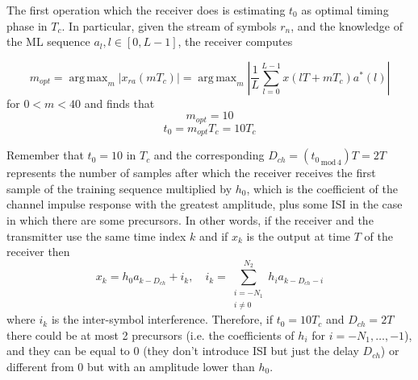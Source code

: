 \documentclass[10pt]{article}
\DeclareMathOperator*{\argmax}{arg\,max}
\newcommand{\lmod}[1] {_{\,\mathrm{mod}\,#1}}
\begin{document}
The first operation which the receiver does is estimating $t_0$ as optimal timing phase in $T_c$. In particular, given the stream of symbols $r_n$, and the knowledge of the ML sequence $a_l, l\in [0, L-1]$, the receiver computes

\begin{equation}
	m_{opt} = \argmax_m | x_{ra}(mT_c) | = \argmax_{m} | \frac{1}{L} \sum_{l = 0}^{L - 1} x(lT + mT_c)a^* (l) |
\end{equation}
for $ 0 < m < 40$ and finds that
\begin{equation}
	m_{opt} = 10
\end{equation}
\begin{equation}
	t_{0} = m_{opt}T_c = 10 T_c
\end{equation}

Remember that $t_0 = 10$ in $T_c$ and the corresponding $D_{ch} = ({t_0}\lmod{4})T = 2T$ represents the number of samples after which the receiver receives the first sample of the training sequence multiplied by $h_0$, which is the coefficient of the channel impulse response with the greatest amplitude, plus some ISI in the case in which there are some precursors. In other words, if the receiver and the transmitter use the same time index $k$ and if $x_k$ is the output at time $T$ of the receiver then
\begin{equation}
x_{k} = h_0a_{k-D_{ch}} + i_k, \quad i_k = \sum_{\substack{i = -N_1 \\ i \neq 0}}^{N_2} h_i a_{k-D_{ch}-i}
\end{equation}
where $i_k$ is the inter-symbol interference. Therefore, if $t_0 = 10T_c$ and $D_{ch} = 2T$ there could be at most 2 precursors (i.e. the coefficients of $h_i$ for $i = -N_1, \dots, -1$), and they can be equal to 0 (they don't introduce ISI but just the delay $D_{ch}$) or different from 0 but with an amplitude lower than $h_0$. 
\end{document}
